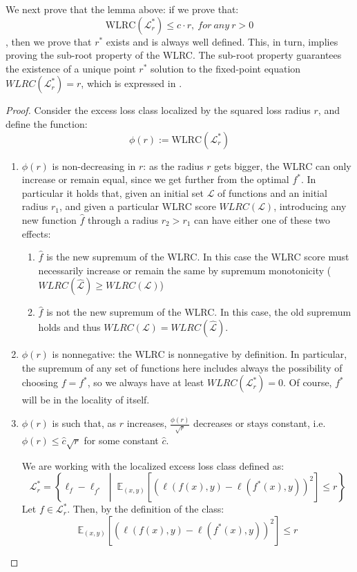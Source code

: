 \documentclass{article}
\newtheorem{proof}{Proof}
\begin{document}
We next prove that the lemma above: if we prove that:
\[
\text{WLRC}(\mathcal{L}_{r}^*) \leq c \cdot r,\ for\ any\ r > 0
\], then we prove that
$r^*$ exists and is always well defined. This, in turn, implies proving the sub-root property of the WLRC. The sub-root property guarantees the existence of a unique point $r^*$ solution to the fixed-point equation $WLRC(\mathcal{L}_r^*)=r$, which is expressed in \cite{WLRC}.
\begin{proof}
Consider the excess loss class localized by the squared loss 
radius $r$, and define the function:
\[
\phi(r) := \text{WLRC}(\mathcal{L}_r^*)
\]
\begin{enumerate}
    \item $\phi(r) $  is non-decreasing in $r$:  as the radius $r$ gets bigger, the WLRC can only increase or remain equal, since we get further from the optimal
    $f^*$. In particular it holds that, given an initial set $\mathcal{L}$ of functions and an initial radius $r_1$, and given a particular WLRC score $WLRC(\mathcal{L})$, introducing any new function $\hat{f}$ through a radius $r_2 > r_1$ can have either one of these two effects: 
    \begin{enumerate}
        \item $\hat{f}$ is the new supremum of the WLRC. In this case the WLRC score must necessarily increase or remain the same by supremum monotonicity ($WLRC(\hat{\mathcal{L}}) \geq WLRC(\mathcal{L})$)
        \item $\hat{f}$ is not the new supremum of the WLRC. In this case, the old supremum holds and thus $WLRC(\mathcal{L}) = WLRC(\hat{\mathcal{L}})$.
    \end{enumerate}
    \item $\phi(r)$ is nonnegative: the WLRC is nonnegative by definition. In particular, the supremum of any set of functions here includes always the possibility of choosing $f=f^*$, so we always have at least $WLRC(\mathcal{L}_r^*)=0$. Of course, $f^*$ will be in the locality of itself.
    \item $\phi(r)$ is such that, as $r$ increases, $\frac{\phi(r)}{\sqrt{r}}$ decreases or stays constant, i.e. $\phi(r) \leq \hat{c}\sqrt{r}$ for some constant $\hat{c}$.

    We are working with the localized excess loss class defined as:
    \[
    \mathcal{L}_r^* = \left\{ \ell_f - \ell_{f^*} \;\middle|\; \mathbb{E}_{(x, y)}\left[ \left( \ell(f(x), y) - \ell(f^*(x), y) \right)^2 \right] \leq r \right\}
    \]
    Let \( f \in \mathcal{L}_r^* \). Then, by the definition of the class:
    \[
    \mathbb{E}_{(x, y)}\left[ \left( \ell(f(x), y) - \ell(f^*(x), y) \right)^2 \right] \leq r
    \]
    

\end{enumerate}
\end{proof}
\end{document}
